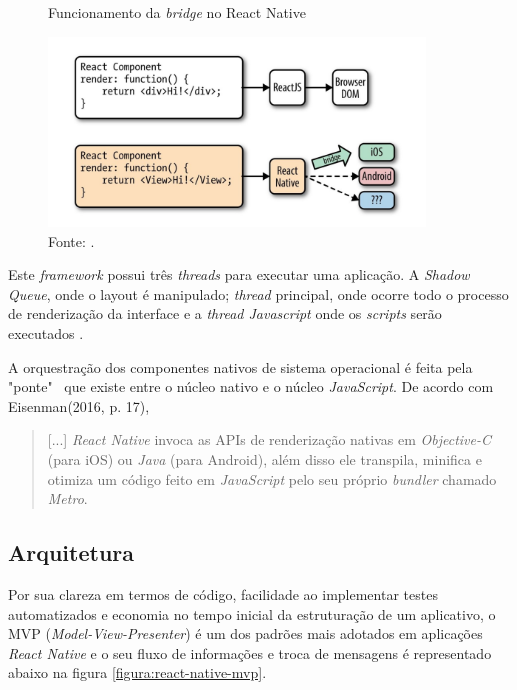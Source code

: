     \begin{figure}[h]
    \caption{Funcionamento da \textit{bridge} no React Native}
    \centering %
    \includegraphics[width=10cm]{imagem/react-native-components.png}
    \caption*{Fonte: \cite{Eisenman2016}.}
    \label{figura:react-native-component}
    \end{figure}
    
    Este \textit{framework} possui três \textit{threads} para executar uma aplicação. A \textit{Shadow Queue}, onde o layout é manipulado; \textit{thread} principal, onde ocorre todo o processo de renderização da interface e a \textit{thread Javascript} onde os \textit{scripts} serão executados \cite{Danielsson998793}.
    
    A orquestração dos componentes nativos de sistema operacional é feita pela "ponte" ~que existe entre o núcleo nativo e o núcleo \textit{JavaScript}. De acordo  com  Eisenman(2016,  p.  17), \begin{quote} [...] \textit{React  Native} invoca  as  APIs de renderização nativas em \textit{Objective-C} (para iOS) ou \textit{Java} (para Android), além disso ele transpila, minifica e otimiza um código feito em \textit{JavaScript} pelo seu próprio \textit{bundler} chamado \textit{Metro}. \end{quote}
    
    \subsection{Arquitetura}
    \label{react_native_mvp}
    
    Por sua clareza em termos de código, facilidade ao implementar testes automatizados e economia no tempo inicial da estruturação de um aplicativo, o MVP (\textit{Model-View-Presenter}) é um dos padrões mais adotados em aplicações \textit{React Native} e o seu fluxo de informações e troca de mensagens é representado abaixo na figura \ref{figura:react-native-mvp}.
    
